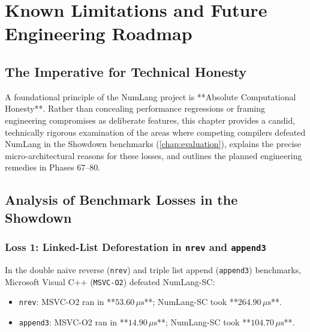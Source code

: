 \chapter{Known Limitations and Future Engineering Roadmap}
\label{chap:limitations}

\section{The Imperative for Technical Honesty}
\label{sec:lim:honesty}

A foundational principle of the NumLang project is **Absolute Computational Honesty**. Rather than concealing performance regressions or framing engineering compromises as deliberate features, this chapter provides a candid, technically rigorous examination of the areas where competing compilers defeated NumLang in the Showdown benchmarks (\cref{chap:evaluation}), explains the precise micro-architectural reasons for these losses, and outlines the planned engineering remedies in Phases 67--80.

\section{Analysis of Benchmark Losses in the Showdown}
\label{sec:lim:losses}

\subsection{Loss 1: Linked-List Deforestation in \texttt{nrev} and \texttt{append3}}
In the double naive reverse (\texttt{nrev}) and triple list append (\texttt{append3}) benchmarks, Microsoft Visual C++ (\texttt{MSVC-O2}) defeated NumLang-SC:
\begin{itemize}
    \item \texttt{nrev}: MSVC-O2 ran in **$53.60\,\mu\text{s}$**; NumLang-SC took **$264.90\,\mu\text{s}$**.
    \item \texttt{append3}: MSVC-O2 ran in **$14.90\,\mu\text{s}$**; NumLang-SC took **$104.70\,\mu\text{s}$**.
\end{itemize}


